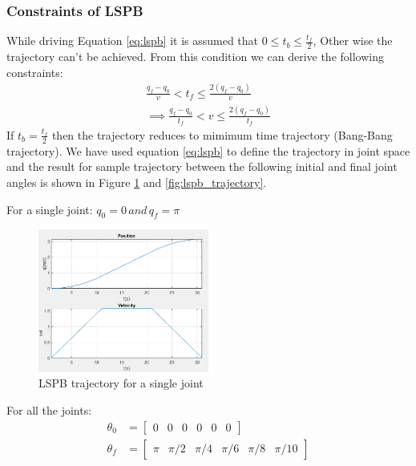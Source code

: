 \subsubsection{Constraints of LSPB}
While driving Equation \ref{eq:lspb} it is assumed that $0 \le t_b \le \frac{t_f}{2}$, Other wise the trajectory can't be achieved. 
From this condition we can derive the following constraints:
\begin{equation} \label{eq:lspb_constraints}
    \begin{aligned}
        \frac{q_f-q_0}{v} < t_f \le \frac{2(q_f-q_0)}{v} \\
        \implies \frac{q_f-q_0}{t_f} < v \le \frac{2(q_f-q_0)}{t_f}
    \end{aligned}
\end{equation}
If $t_b = \frac{t_f}{2}$ then the trajectory reduces to mimimum time trajectory (Bang-Bang trajectory).
We have used equation \ref{eq:lspb} to define the trajectory in joint space and the result for sample trajectory between the following initial 
and final joint angles is shown in Figure \ref{fig:lspb_single} and \ref{fig:lspb_trajectory}.

For a single joint: $q_0 = 0\, and \, q_f = \pi$
\begin{figure}[H]
    \centering
    \includegraphics[width=0.5\textwidth]{images/lspb_single_joint.png}
    \caption{LSPB trajectory for a single joint}
    \label{fig:lspb_single}
\end{figure}
For all the joints:
\begin{equation*}
    \begin{aligned}
        \theta_0 &= \begin{bmatrix}
            0 & 0 & 0 & 0 & 0 & 0
        \end{bmatrix}\\
        \theta_f &= \begin{bmatrix}
            \pi & \pi/2 & \pi/4 & \pi/6 & \pi/8 & \pi/10
        \end{bmatrix}
    \end{aligned}
\end{equation*}

